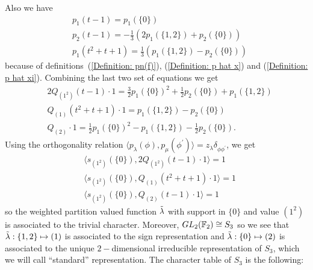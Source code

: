  Also we have 
 \begin{equation}
     \begin{split}
         &p_1(t-1)=p_1(\{0\})\\
         &p_2(t-1)=-\frac{1}{3}(2p_1(\{1,2\})+p_2(\{0\}))\\
         &p_1(t^2+t+1)=\frac{1}{3}(p_1(\{1,2\})-p_2(\{0\}))
     \end{split}
 \end{equation}
 because of definitions~(\ref{Definition: pn(f)}), (\ref{Definition: p hat x}) and (\ref{Definition: p hat xi}). Combining the last two set of equations we get
 \begin{equation}
     \begin{split}
         &2Q_{(1^2)}(t-1)\cdot1=\frac{3}{2}p_1(\{0\})^2+\frac{1}{2}p_2(\{0\})+p_1(\{1,2\})\\
         &Q_{(1)}(t^2+t+1)\cdot1 = p_1(\{1,2\})-p_2(\{0\})\\
         &Q_{(2)}\cdot1=\frac{1}{2}p_1(\{0\})^2-p_1(\{1,2\})-\frac{1}{2}p_2(\{0\}).
     \end{split}
 \end{equation}
 Using the orthogonality relation $\langle p_\lambda(\phi),p_\mu(\phi^\prime)\rangle=z_\lambda\delta_{\phi\phi^\prime}$, we get
 \begin{equation}
     \begin{split}
         &\langle s_{(1^2)}(\{0\}), 2Q_{(1^2)}(t-1)\cdot1\rangle =1\\
         &\langle s_{(1^2)}(\{0\}), Q_{(1)}(t^2+t+1)\cdot1\rangle =1\\
         &\langle s_{(1^2)}(\{0\}), Q_{(2)}(t-1)\cdot1\rangle =1
     \end{split}
 \end{equation}
 so the weighted partition valued function $\Tilde{\lambda}$ with support in $\{0\}$ and value $(1^2)$ is associated to the trivial character. Moreover, $GL_2(\mathbb{F}_2)\cong S_3$ so we see that $\Tilde{\lambda}: \{1,2\}\mapsto (1)$ is associated to the sign representation and $\Tilde{\lambda}: \{0\}\mapsto (2)$ is associated to the unique $2-$dimensional irreducible representation of $S_3$, which we will call ``standard'' representation. The character table of $S_3$ is the following:

